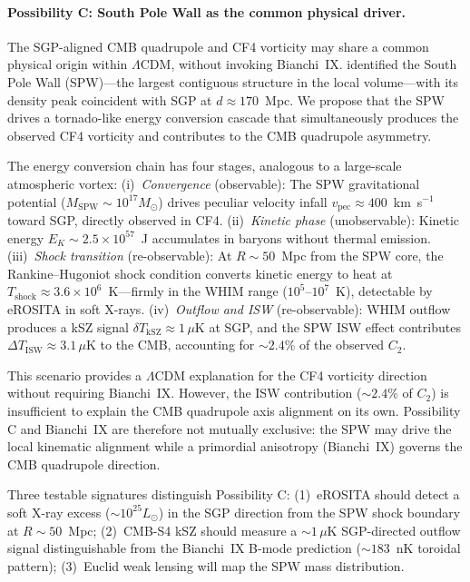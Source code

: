 \documentclass[12pt]{article}
\begin{document}
\paragraph{Possibility C: South Pole Wall as the common physical driver.}
The SGP-aligned CMB quadrupole and CF4 vorticity may share a common physical origin
within $\Lambda$CDM, without invoking Bianchi~IX.
\citet{Pomarede2020} identified the South Pole Wall (SPW)---the largest contiguous
structure in the local volume---with its density peak coincident with SGP at
$d\approx170$~Mpc. We propose that the SPW drives a tornado-like energy conversion
cascade that simultaneously produces the observed CF4 vorticity and contributes to
the CMB quadrupole asymmetry.

The energy conversion chain has four stages, analogous to a large-scale atmospheric
vortex: (i)~\emph{Convergence} (observable): The SPW gravitational potential
($M_\mathrm{SPW}\sim10^{17}M_\odot$) drives peculiar velocity infall
$v_\mathrm{pec}\approx400$~km~s$^{-1}$ toward SGP, directly observed in CF4.
(ii)~\emph{Kinetic phase} (unobservable): Kinetic energy
$E_K\sim2.5\times10^{57}$~J accumulates in baryons without thermal emission.
(iii)~\emph{Shock transition} (re-observable): At $R\sim50$~Mpc from the SPW core,
the Rankine--Hugoniot shock condition converts kinetic energy to heat at
$T_\mathrm{shock}\approx3.6\times10^6$~K---firmly in the WHIM range
($10^5$--$10^7$~K), detectable by eROSITA in soft X-rays.
(iv)~\emph{Outflow and ISW} (re-observable): WHIM outflow produces a kSZ signal
$\delta T_\mathrm{kSZ}\approx1\,\mu$K at SGP, and the SPW ISW effect contributes
$\Delta T_\mathrm{ISW}\approx3.1\,\mu$K to the CMB, accounting for $\sim2.4\%$ of
the observed $C_2$.

This scenario provides a $\Lambda$CDM explanation for the CF4 vorticity direction
without requiring Bianchi~IX. However, the ISW contribution ($\sim2.4\%$ of $C_2$)
is insufficient to explain the CMB quadrupole axis alignment on its own.
Possibility C and Bianchi~IX are therefore not mutually exclusive: the SPW may drive
the local kinematic alignment while a primordial anisotropy (Bianchi~IX) governs
the CMB quadrupole direction.

Three testable signatures distinguish Possibility C:
(1)~eROSITA should detect a soft X-ray excess ($\sim10^{25}L_\odot$) in the SGP
direction from the SPW shock boundary at $R\sim50$~Mpc;
(2)~CMB-S4 kSZ should measure a $\sim1\,\mu$K SGP-directed outflow signal
distinguishable from the Bianchi~IX B-mode prediction ($\sim183$~nK toroidal
pattern);
(3)~Euclid weak lensing will map the SPW mass distribution.
\end{document}
